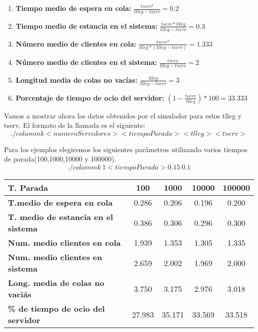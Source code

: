\documentclass[]{article}
\begin{document}
\begin{enumerate}
	\item \textbf{Tiempo medio de espera en cola: }$\frac{tserv^2}{tlleg-tserv}=0.2$
	\item \textbf{Tiempo medio de estancia en el sistema: }$\frac{tserv*tlleg}{tlleg-tserv} = 0.3$
	\item \textbf{Número medio de clientes en cola: }$\frac{tserv^2}{tlleg*(tlleg-tserv)}=1.333$
	\item \textbf{Número medio de clientes en el sistema: }$\frac{tserv}{tlleg-tserv}=2$
	\item \textbf{Longitud media de colas no vacías: }$\frac{tlleg}{tlleg-tserv}=3$
	\item \textbf{Porcentaje de tiempo de ocio del servidor: }$(1-\frac{tserv}{tlleg})*100=33.333$
\end{enumerate}

Vamos a mostrar ahora los datos obtenidos por el simulador para estos tlleg y tserv. El formato de la llamada es el siguiente:
$$./colammk <numeroServidores> <tiempoParada> <tlleg> <tserv>$$

Para los ejemplos elegiremos los siguientes parámetros utilizando varios tiempos de parada(100,1000,10000 y 100000).
$$./colammk\ 1 <tiempoParada> 0.15\ 0.1$$

\begin{table}[H]
	\begin{center}
		\begin{tabularx}{1\textwidth}{|X|c|c|c|c|}
			\hline
			 \textbf{T. Parada} & 100 & 1000 & 10000 & 100000 \\
			\hline \hline
			\textbf{T.medio de espera en cola}& 0.286& 0.206&0.196 & 0.200\\ \hline
			\textbf{T. medio de estancia en el sistema}& 0.386 & 0.306&0.296 & 0.300\\ \hline
			\textbf{Num. medio clientes en cola}& 1.939 & 1.353& 1.305&1.335\\ \hline
			\textbf{Num. medio clientes en sistema}& 2.659 & 2.002&1.969 &2.000\\ \hline
			\textbf{Long. media de colas no vaciás}&3.750& 3.175&2.976 &3.018\\ \hline
			\textbf{\% de tiempo de ocio del servidor}&27.983&35.171 &33.569 &33.518\\ \hline
		\end{tabularx}
		
	\end{center}
\end{table}
\end{document}
